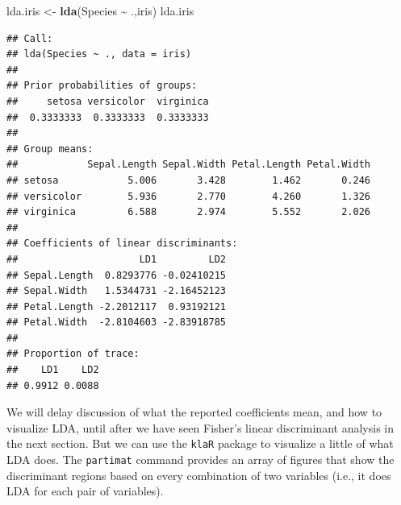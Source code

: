 \documentclass[
]{book}
\newenvironment{Shaded}{\begin{snugshade}}{\end{snugshade}}
\newcommand{\AttributeTok}[1]{\textcolor[rgb]{0.13,0.29,0.53}{#1}}
\newcommand{\FunctionTok}[1]{\textcolor[rgb]{0.13,0.29,0.53}{\textbf{#1}}}
\newcommand{\NormalTok}[1]{#1}
\newcommand{\OtherTok}[1]{\textcolor[rgb]{0.56,0.35,0.01}{#1}}
\newcommand{\SpecialCharTok}[1]{\textcolor[rgb]{0.81,0.36,0.00}{\textbf{#1}}}
\newcommand{\StringTok}[1]{\textcolor[rgb]{0.31,0.60,0.02}{#1}}
\theoremstyle{definition}
\theoremstyle{definition}
\theoremstyle{definition}
\theoremstyle{definition}
\theoremstyle{remark}
\begin{document}
\begin{Shaded}
\begin{Highlighting}[]
\NormalTok{lda.iris }\OtherTok{\textless{}{-}} \FunctionTok{lda}\NormalTok{(Species }\SpecialCharTok{\textasciitilde{}}\NormalTok{ .,iris)}
\NormalTok{lda.iris }
\end{Highlighting}
\end{Shaded}

\begin{verbatim}
## Call:
## lda(Species ~ ., data = iris)
## 
## Prior probabilities of groups:
##     setosa versicolor  virginica 
##  0.3333333  0.3333333  0.3333333 
## 
## Group means:
##            Sepal.Length Sepal.Width Petal.Length Petal.Width
## setosa            5.006       3.428        1.462       0.246
## versicolor        5.936       2.770        4.260       1.326
## virginica         6.588       2.974        5.552       2.026
## 
## Coefficients of linear discriminants:
##                     LD1         LD2
## Sepal.Length  0.8293776 -0.02410215
## Sepal.Width   1.5344731 -2.16452123
## Petal.Length -2.2012117  0.93192121
## Petal.Width  -2.8104603 -2.83918785
## 
## Proportion of trace:
##    LD1    LD2 
## 0.9912 0.0088
\end{verbatim}

We will delay discussion of what the reported coefficients mean, and how to visualize LDA, until after we have seen Fisher's linear discriminant analysis in the next section. But we can use the \texttt{klaR} package to visualize a little of what LDA does. The \texttt{partimat} command provides an array of figures that show the discriminant regions based on every combination of two variables (i.e., it does LDA for each pair of variables).

\begin{Shaded}
\end{Shaded}
\end{document}
